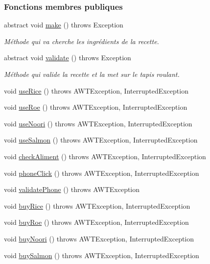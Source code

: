 \subsubsection*{Fonctions membres publiques}
\begin{DoxyCompactItemize}
\item 
abstract void \hyperlink{classSuchi_1_1Recette_affdb09f58c6805ab7a5b9a53f9d9c623}{make} ()  throws Exception
\begin{DoxyCompactList}\small\item\em Méthode qui va cherche les ingrédients de la recette. \end{DoxyCompactList}\item 
abstract void \hyperlink{classSuchi_1_1Recette_a918c793fae31008712c585986b01f435}{validate} ()  throws Exception
\begin{DoxyCompactList}\small\item\em Méthode qui valide la recette et la met sur le tapis roulant. \end{DoxyCompactList}\item 
void \hyperlink{classSuchi_1_1Recette_aa5204bd305d5029631ff4b8be9def83e}{use\+Rice} ()  throws A\+W\+T\+Exception, Interrupted\+Exception
\item 
void \hyperlink{classSuchi_1_1Recette_a500a2584148f1f08a1c7cdf7424e9a9c}{use\+Roe} ()  throws A\+W\+T\+Exception, Interrupted\+Exception
\item 
void \hyperlink{classSuchi_1_1Recette_a17d14fe05c28a44768d91e577e9bc511}{use\+Noori} ()  throws A\+W\+T\+Exception, Interrupted\+Exception
\item 
void \hyperlink{classSuchi_1_1Recette_a0fc2aa67439d0822762548c49cb29dec}{use\+Salmon} ()  throws A\+W\+T\+Exception, Interrupted\+Exception
\item 
void \hyperlink{classSuchi_1_1Recette_adc00873c980219a9a3fa7eddeaea3253}{check\+Aliment} ()  throws A\+W\+T\+Exception, Interrupted\+Exception
\item 
void \hyperlink{classSuchi_1_1Recette_a3e4c1e285cd28d0f2f2d364ea637c165}{phone\+Click} ()  throws A\+W\+T\+Exception, Interrupted\+Exception
\item 
void \hyperlink{classSuchi_1_1Recette_aae633102735c0f0a23f0aa84a0366fb3}{validate\+Phone} ()  throws A\+W\+T\+Exception
\item 
void \hyperlink{classSuchi_1_1Recette_a6e0c330317a6f65f2961d35f262362e7}{buy\+Rice} ()  throws A\+W\+T\+Exception, Interrupted\+Exception
\item 
void \hyperlink{classSuchi_1_1Recette_a019d29ed18bfa21dd4bf2ec681761fbf}{buy\+Roe} ()  throws A\+W\+T\+Exception, Interrupted\+Exception
\item 
void \hyperlink{classSuchi_1_1Recette_a31ee8b7bb1aeb396895509a5d5dea094}{buy\+Noori} ()  throws A\+W\+T\+Exception, Interrupted\+Exception
\item 
void \hyperlink{classSuchi_1_1Recette_aef0e38b7827110dbb4fd6a70777cddc1}{buy\+Salmon} ()  throws A\+W\+T\+Exception, Interrupted\+Exception
\end{DoxyCompactItemize}
